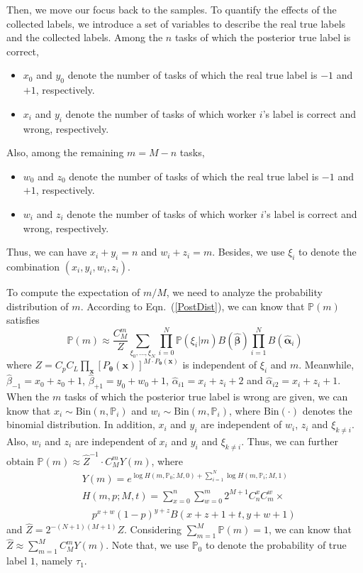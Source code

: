 \documentclass{article}
\begin{document}
Then, we move our focus back to the samples.
To quantify the effects of the collected labels, we introduce a set of variables to describe the real true labels and the collected labels.
Among the $n$ tasks of which the posterior true label is correct,
\begin{itemize}[noitemsep,topsep=0pt]
\item $x_0$ and $y_0$ denote the number of tasks of which the real true label is $-1$ and $+1$, respectively.
\item $x_i$ and $y_i$ denote the number of tasks of which worker $i$'s label is correct and wrong, respectively.
\end{itemize}
Also, among the remaining $m=M-n$ tasks, 
\begin{itemize}[noitemsep,topsep=0pt]
\item $w_0$ and $z_0$ denote the number of tasks of which the real true label is $-1$ and $+1$, respectively.
\item $w_i$ and $z_i$ denote the number of tasks of which worker $i$'s label is correct and wrong, respectively.
\end{itemize}
Thus, we can have $x_i+y_i=n$ and $w_i+z_i=m$. Besides, we use $\xi_i$ to denote the combination $(x_i,y_i,w_i, z_i)$.

To compute the expectation of $m/M$, we need to analyze the probability distribution of $m$. According to Eqn.~(\ref{PostDist}), we can know that $\mathbb{P}(m)$ satisfies
\begin{equation}
\mathbb{P}(m) \approx \frac{C_{M}^{m}}{Z} \sum_{\xi_0,\ldots, \xi_N}\prod_{i=0}^{N}\mathbb{P}(\xi_i|m) B(\hat{\bm{\beta}})\prod_{i=1}^{N}B(\hat{\bm{\alpha}}_{i})
\end{equation}
where $Z=C_pC_L{\prod}_{\bm{x}} [P_{\bm{\theta}}(\bm{x})]^{M\cdot P_{\bm{\theta}}(\bm{x})}$ is independent of $\xi_i$ and $m$.
Meanwhile, $\hat{\beta}_{-1}=x_0+z_0+1$, $\hat{\beta}_{+1}=y_0+w_0+1$, $\hat{\alpha}_{i1}=x_i+z_i+2$ and $\hat{\alpha}_{i2}=x_i+z_i+1$.
When the $m$ tasks of which the posterior true label is wrong are given, we can know that $x_i\sim \mathrm{Bin}(n, \mathbb{P}_i)$ and $w_i\sim \mathrm{Bin}(m, \mathbb{P}_i)$, where $\mathrm{Bin}(\cdot)$ denotes the binomial distribution.
In addition, $x_i$ and $y_i$ are independent of $w_i$, $z_i$ and $\xi_{k\neq i}$.
Also, $w_i$ and $z_i$ are independent of $x_i$ and $y_i$ and $\xi_{k\neq i}$.
Thus, we can further obtain $\mathbb{P}(m)\approx \hat{Z}^{-1}\cdot C_{M}^{m}Y(m)$, where
\begin{equation}
\label{PDist}
\begin{split}
&Y(m) =e^{\log H(m,\mathbb{P}_0;M,0)+\sum_{i=1}^{N}\log H(m,\mathbb{P}_i;M,1)}\\
&H(m,p;M,t)={\sum}_{x=0}^{n}{\sum}_{w=0}^{m} 2^{M+1}C_{n}^{x}C_{m}^{w}\times\\
&\quad p^{x+w}(1-p)^{y+z}B(x+z+1+t,y+w+1)
\end{split}
\end{equation}
and $\hat{Z}=2^{-(N+1)(M+1)}Z$.
Considering $\sum_{m=1}^{M} \mathbb{P}(m)=1$, we can know that $\hat{Z}\approx{\sum}_{m=1}^{M}C_{M}^{m}Y(m)$. Note that, we use $\mathbb{P}_0$ to denote the probability of true label $1$, namely $\tau_1$.
\end{document}

